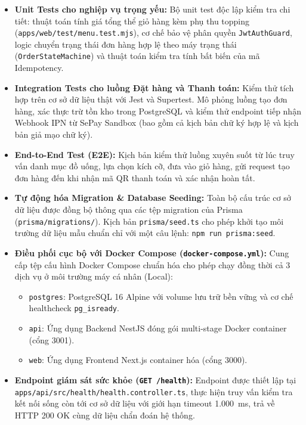 \documentclass[a4paper]{article}
\begin{document}
\begin{itemize}
    \item \textbf{Unit Tests cho nghiệp vụ trọng yếu:}
    Bộ unit test độc lập kiểm tra chi tiết: thuật toán tính giá tổng thể giỏ hàng kèm phụ thu topping (\texttt{apps/web/test/menu.test.mjs}), cơ chế bảo vệ phân quyền \texttt{JwtAuthGuard}, logic chuyển trạng thái đơn hàng hợp lệ theo máy trạng thái (\texttt{OrderStateMachine}) và thuật toán kiểm tra tính bất biến của mã Idempotency.
    
    \item \textbf{Integration Tests cho luồng Đặt hàng và Thanh toán:}
    Kiểm thử tích hợp trên cơ sở dữ liệu thật với Jest và Supertest. Mô phỏng luồng tạo đơn hàng, xác thực trừ tồn kho trong PostgreSQL và kiểm thử endpoint tiếp nhận Webhook IPN từ SePay Sandbox (bao gồm cả kịch bản chữ ký hợp lệ và kịch bản giả mạo chữ ký).

    \item \textbf{End-to-End Test (E2E):}
    Kịch bản kiểm thử luồng xuyên suốt từ lúc truy vấn danh mục đồ uống, lựa chọn kích cỡ, đưa vào giỏ hàng, gửi request tạo đơn hàng đến khi nhận mã QR thanh toán và xác nhận hoàn tất.

    \item \textbf{Tự động hóa Migration \& Database Seeding:}
    Toàn bộ cấu trúc cơ sở dữ liệu được đồng bộ thông qua các tệp migration của Prisma (\texttt{prisma/migrations/}). Kịch bản \texttt{prisma/seed.ts} cho phép khởi tạo môi trường dữ liệu mẫu chuẩn chỉ với một câu lệnh: \texttt{npm run prisma:seed}.

    \item \textbf{Điều phối cục bộ với Docker Compose (\texttt{docker-compose.yml}):}
    Cung cấp tệp cấu hình Docker Compose chuẩn hóa cho phép chạy đồng thời cả 3 dịch vụ ở môi trường máy cá nhân (Local):
    \begin{itemize}
        \item \texttt{postgres}: PostgreSQL 16 Alpine với volume lưu trữ bền vững và cơ chế healthcheck \texttt{pg\_isready}.
        \item \texttt{api}: Ứng dụng Backend NestJS đóng gói multi-stage Docker container (cổng 3001).
        \item \texttt{web}: Ứng dụng Frontend Next.js container hóa (cổng 3000).
    \end{itemize}

    \item \textbf{Endpoint giám sát sức khỏe (\texttt{GET /health}):}
    Endpoint được thiết lập tại \texttt{apps/api/src/health/health.controller.ts}, thực hiện truy vấn kiểm tra kết nối sống còn tới cơ sở dữ liệu với giới hạn timeout 1.000~ms, trả về HTTP 200 OK cùng dữ liệu chẩn đoán hệ thống.
\end{itemize}
\end{document}
